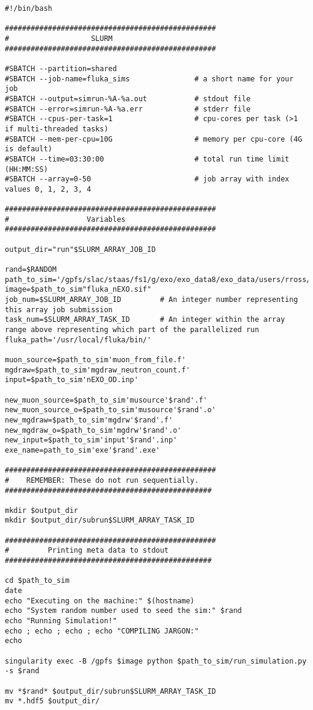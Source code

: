 \begin{linenumbers}
\begin{verbatim}
#!/bin/bash

#################################################
#                   SLURM
#################################################

#SBATCH --partition=shared
#SBATCH --job-name=fluka_sims               # a short name for your job
#SBATCH --output=simrun-%A-%a.out           # stdout file
#SBATCH --error=simrun-%A-%a.err            # stderr file
#SBATCH --cpus-per-task=1                   # cpu-cores per task (>1 if multi-threaded tasks)
#SBATCH --mem-per-cpu=10G                   # memory per cpu-core (4G is default)
#SBATCH --time=03:30:00                     # total run time limit (HH:MM:SS)
#SBATCH --array=0-50                        # job array with index values 0, 1, 2, 3, 4

#################################################
#                  Variables
#################################################

output_dir="run"$SLURM_ARRAY_JOB_ID

rand=$RANDOM
path_to_sim='/gpfs/slac/staas/fs1/g/exo/exo_data8/exo_data/users/rross/flukaSims/'
image=$path_to_sim"fluka_nEXO.sif"
job_num=$SLURM_ARRAY_JOB_ID         # An integer number representing this array job submission
task_num=$SLURM_ARRAY_TASK_ID       # An integer within the array range above representing which part of the parallelized run
fluka_path='/usr/local/fluka/bin/'

muon_source=$path_to_sim'muon_from_file.f'
mgdraw=$path_to_sim'mgdraw_neutron_count.f'
input=$path_to_sim'nEXO_OD.inp'

new_muon_source=$path_to_sim'musource'$rand'.f'
new_muon_source_o=$path_to_sim'musource'$rand'.o'
new_mgdraw=$path_to_sim'mgdrw'$rand'.f'
new_mgdraw_o=$path_to_sim'mgdrw'$rand'.o'
new_input=$path_to_sim'input'$rand'.inp'
exe_name=path_to_sim'exe'$rand'.exe'

#################################################
#    REMEMBER: These do not run sequentially.
################################################

mkdir $output_dir
mkdir $output_dir/subrun$SLURM_ARRAY_TASK_ID

#################################################
#         Printing meta data to stdout
################################################

cd $path_to_sim
date
echo "Executing on the machine:" $(hostname) 
echo "System random number used to seed the sim:" $rand
echo "Running Simulation!"
echo ; echo ; echo ; echo "COMPILING JARGON:"
echo

singularity exec -B /gpfs $image python $path_to_sim/run_simulation.py -s $rand

mv *$rand* $output_dir/subrun$SLURM_ARRAY_TASK_ID
mv *.hdf5 $output_dir/
\end{verbatim}
\end{linenumbers}